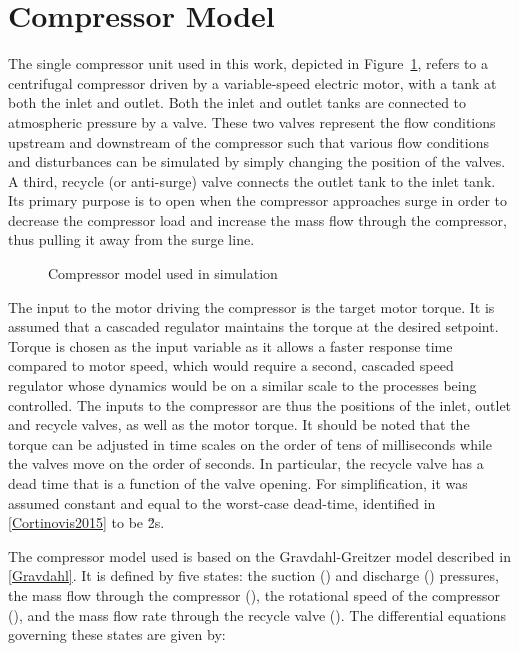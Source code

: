 \section{Compressor Model}
\label{sec:mod:comp}

The single compressor unit used in this work, depicted in Figure~\ref{fig:mod:single_comp}, refers to a centrifugal compressor driven by a variable-speed electric motor, with a tank at both the inlet and outlet. 
Both the inlet and outlet tanks are connected to atmospheric pressure by a valve.
These two valves represent the flow conditions upstream and downstream of the compressor such that various flow conditions and disturbances can be simulated by simply changing the position of the valves. 
A third, recycle (or anti-surge) valve connects the outlet tank to the inlet tank. Its primary purpose is to open when the compressor approaches surge in order to decrease the compressor load and increase the mass flow through the compressor, thus pulling it away from the surge line. 

\begin{figure}
  \centering
  \resizebox{0.7\linewidth}{!}{%
    \begin{tikzpicture}
      \drawcomp
    \end{tikzpicture}
  }
  \caption{Compressor model used in simulation}
  \label{fig:mod:single_comp}
\end{figure}


The input to the motor driving the compressor is the target motor torque. 
It is assumed that a cascaded regulator maintains the torque at the desired setpoint.
Torque is chosen as the input variable as it allows a faster response time compared to motor speed, which would require a second, cascaded speed regulator whose dynamics would be on a similar scale to the processes being controlled.
The inputs to the compressor are thus the positions of the inlet, outlet and recycle valves, as well as the motor torque. It should be noted that the torque can be adjusted in time scales on the order of tens of milliseconds while the valves move on the order of seconds. In particular, the recycle valve has a dead time that is a function of the valve opening. For simplification, it was assumed constant and equal to the worst-case dead-time, identified in \ref{Cortinovis2015} to be \u{2}{s}.


The compressor model used is based on the Gravdahl-Greitzer model described in \ref{Gravdahl}. It is defined by five states: the suction () and discharge () pressures, the mass flow through the compressor (), the rotational speed of the compressor (), and the mass flow rate through the recycle valve ().
The differential equations governing these states are given by: 

